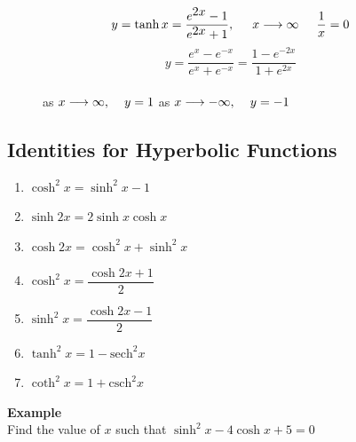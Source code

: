 \documentclass[11pt,a4paper]{article}
\begin{document}
\vspace{0.5cm}
\begin{figure}[H]
\centering
$$y=\tanh x =\dfrac{e^{\displaystyle{2x}}-1}{e^{\displaystyle{2x}}+1},\hspace{0.5cm}x\longrightarrow \infty \hspace{0.5cm} \dfrac{1}{x}=0$$
$$y=\dfrac{e^x-e^{-x}}{e^x+e^{-x}}=\dfrac{1-e^{-2x}}{1+e^{2x}}$$\\
as $x\longrightarrow \infty,\hspace{0.4cm} y=1$  as $x\longrightarrow -\infty,\hspace{0.4cm} y=-1$\\
\vspace{0.5cm}
\end{figure}



\vspace{1cm}














\subsection{Identities for Hyperbolic Functions}

\begin{enumerate}
\item $\cosh^2x=\sinh^2x-1$
\item $\sinh 2x=2\sinh x\cosh x$
\item $\cosh 2x=\cosh^2x+\sinh^2x$
\item $\cosh^2x=\dfrac{\cosh 2x+1}{2}$
\item $\sinh^2x=\dfrac{\cosh 2x-1}{2}$
\item $\tanh^2x=1-\text{sech}^2x$
\item $\coth^2x=1+\text{csch}^2x$\\
\end{enumerate}


\textbf{Example}\\
Find the value of $x$ such that $\sinh^2x-4\cosh x +5=0$\\
\end{document}
